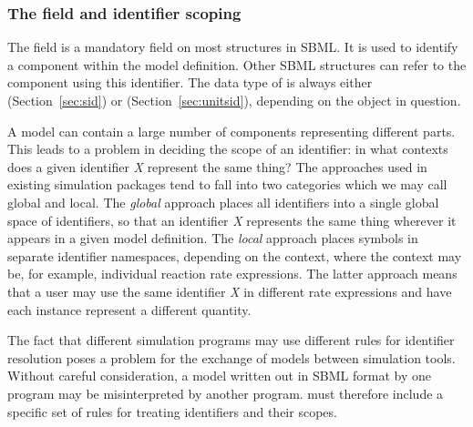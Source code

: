 \subsubsection{The  field and identifier scoping}
\label{sec:identifiers}

The  field is a mandatory field on most structures in
SBML.  It is used to identify a component within the model
definition.  Other SBML structures can refer to the component
using this identifier.  The data type of  is always
either  (Section~\ref{sec:sid}) or
 (Section~\ref{sec:unitsid}), depending on the
object in question.

A model can contain a large number of components representing
different parts.  This leads to a problem in deciding the scope of
an identifier: in what contexts does a given identifier \emph{X}
represent the same thing?  The approaches used in existing
simulation packages tend to fall into two categories which we may
call global and local.  The \emph{global} approach places all
identifiers into a single global space of identifiers, so that an
identifier \emph{X} represents the same thing wherever it appears
in a given model definition.  The \emph{local} approach places
symbols in separate identifier namespaces, depending on the
context, where the context may be, for example, individual
reaction rate expressions.  The latter approach means that a user
may use the same identifier \emph{X} in different rate expressions
and have each instance represent a different quantity.

The fact that different simulation programs may use different
rules for identifier resolution poses a problem for the exchange
of models between simulation tools.  Without careful
consideration, a model written out in SBML format by one program
may be misinterpreted by another program.  \sbmltwo must therefore
include a specific set of rules for treating identifiers and their
scopes.

